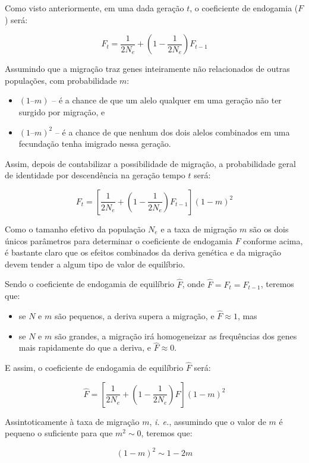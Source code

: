 \documentclass[
]{book}
\begin{document}
Como visto anteriormente, em uma dada geração \(t\), o coeficiente de endogamia (\(F\)) será:

\[F_t = \frac{1}{2N_e} + \left( 1- \frac{1}{2N_e} \right)F_{t-1}\]

Assumindo que a migração traz genes inteiramente não relacionados de outras populações, com probabilidade \(m\):

\begin{itemize}
\item
  \((1 – m)\) -- é a chance de que um alelo qualquer em uma geração não ter surgido por migração, e
\item
  \((1 – m)^2\) -- é a chance de que nenhum dos dois alelos combinados em uma fecundação tenha imigrado nessa geração.
\end{itemize}

Assim, depois de contabilizar a possibilidade de migração, a probabilidade geral de identidade por descendência na geração tempo \(t\) será:

\[F_t = \left[ \frac{1}{2N_e} + \left( 1- \frac{1}{2N_e} \right)F_{t-1} \right] \left( 1-m\right)^2\]

Como o tamanho efetivo da população \(N_e\) e a taxa de migração \(m\) são os dois únicos parâmetros para determinar o coeficiente de endogamia \(F\) conforme acima, é bastante claro que os efeitos combinados da deriva genética e da migração devem tender a algum tipo de valor de equilíbrio.

Sendo o coeficiente de endogamia de equilíbrio \(\hat{F}\), onde \(\hat{F} = F_t = F_{t-1}\), teremos que:

\begin{itemize}
\item
  se \(N\) e \(m\) são pequenos, a deriva supera a migração, e \(\hat{F} \approx 1\), mas
\item
  se \(N\) e \(m\) são grandes, a migração irá homogeneizar as frequências dos genes mais rapidamente do que a deriva, e \(\hat{F} \approx 0\).
\end{itemize}

E assim, o coeficiente de endogamia de equilíbrio \(\hat{F}\) será:

\[\hat{F} = \left[ \frac{1}{2N_e} + \left( 1- \frac{1}{2N_e} \right)\hat{F} \right] \left( 1-m\right)^2\]

Assintoticamente à taxa de migração \(m\), \emph{i. e.}, assumindo que o valor de \(m\) é pequeno o suficiente para que \(m^2 \sim 0\), teremos que:

\[ (1 - m)^2 \sim 1-2m\]
\end{document}
